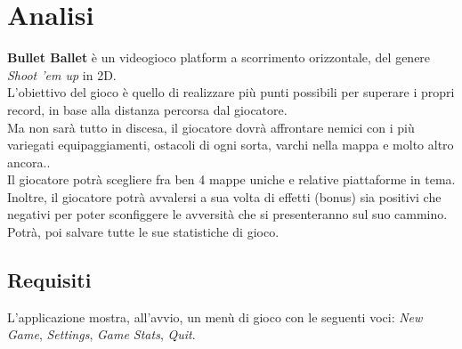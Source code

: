 
\chapter{Analisi}

\textsf{\small \textbf{Bullet Ballet} è un videogioco platform a scorrimento orizzontale, del genere \emph{Shoot 'em up} in 2D.}\\
\textsf{\small L'obiettivo del gioco è quello di realizzare più punti possibili per superare i propri record, in base alla distanza percorsa dal giocatore.}\\

\textsf{\small Ma non sarà tutto in discesa, il giocatore dovrà affrontare nemici con i più variegati equipaggiamenti, ostacoli di ogni sorta, varchi nella mappa e molto altro ancora..}\\
\textsf{\small Il giocatore potrà scegliere fra ben 4 mappe uniche e relative piattaforme in tema.}\\

\textsf{\small Inoltre, il giocatore potrà avvalersi a sua volta di effetti (bonus) sia positivi che negativi per poter sconfiggere le avversità che si presenteranno sul suo cammino.}\\

\textsf{\small Potrà, poi salvare tutte le sue statistiche di gioco.}\\

\section{Requisiti}

\textsf{\small L'applicazione mostra, all'avvio, un menù di gioco con le seguenti voci: \emph{New Game}, \emph{Settings}, \emph{Game Stats}, \emph{Quit}.}\\

